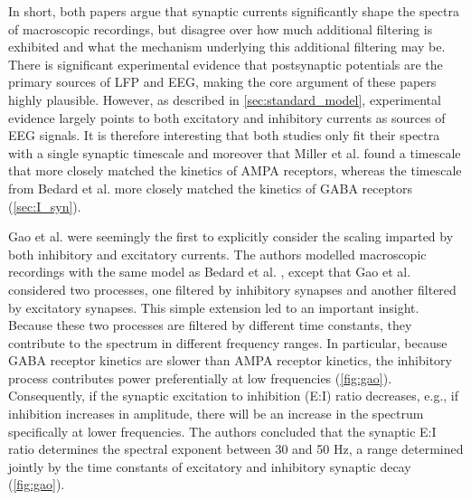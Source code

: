 In short, both papers argue that synaptic currents significantly shape the spectra of macroscopic recordings, but disagree over how much additional filtering is exhibited and what the mechanism underlying this additional filtering may be. There is significant experimental evidence that postsynaptic potentials are the primary sources of LFP and EEG, making the core argument of these papers highly plausible. However, as described in \autoref{sec:standard_model}, experimental evidence largely points to both excitatory and inhibitory currents as sources of EEG signals. It is therefore interesting that both studies only fit their spectra with a single synaptic timescale and moreover that Miller et al. \cite{Miller2009} found a timescale that more closely matched the kinetics of AMPA receptors, whereas the timescale from Bedard et al. \cite{Bedard2006} more closely matched the kinetics of GABA receptors (\autoref{sec:I_syn}).

Gao et al. \cite{Gao2017} were seemingly the first to explicitly consider the scaling imparted by both inhibitory and excitatory currents. The authors modelled macroscopic recordings with the same model as Bedard et al. \cite{Bedard2006}, except that Gao et al. considered two processes, one filtered by inhibitory synapses and another filtered by excitatory synapses. This simple extension led to an important insight. Because these two processes are filtered by different time constants, they contribute to the spectrum in different frequency ranges. In particular, because GABA receptor kinetics are slower than AMPA receptor kinetics, the inhibitory process contributes power preferentially at low frequencies (\autoref{fig:gao}). Consequently, if the synaptic excitation to inhibition (E:I) ratio decreases, e.g., if inhibition increases in amplitude, there will be an increase in the spectrum specifically at lower frequencies. The authors concluded that the synaptic E:I ratio determines the spectral exponent between 30 and 50 Hz, a range determined jointly by the time constants of excitatory and inhibitory synaptic decay (\autoref{fig:gao}).

